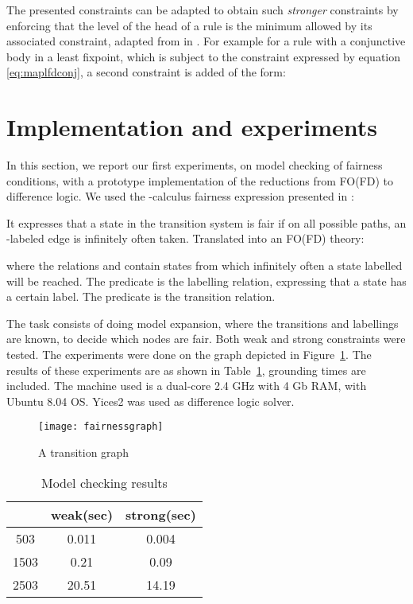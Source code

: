 \documentclass{tlp}
\begin{document}
The presented constraints can be adapted to obtain such \emph{stronger} constraints by enforcing that the level of the head of a rule is the minimum allowed by its associated constraint, adapted from in \cite{lpnmr/JanhunenNS09,amai/Niemela08}. For example for a rule with a conjunctive body in a least fixpoint, which is subject to the constraint expressed by equation \ref{eq:maplfdconj}, a second constraint is added of the form:



\section{Implementation and experiments}\label{sec:exper}
In this section, we report our first experiments, on model checking of fairness conditions, with a prototype implementation of the reductions from FO(FD) to difference logic. We used the -calculus fairness expression presented in \cite{tacas/LiuRS98}:

It expresses that a state in the transition system is fair if on all possible paths, an -labeled edge is infinitely often taken. Translated into an FO(FD) theory:

where the relations  and  contain states from which infinitely often a state labelled  will be reached. The predicate  is the labelling relation, expressing that a state has a certain label. The predicate  is the transition relation.

The task consists of doing model expansion, where the transitions and labellings are known, to decide which nodes are fair. Both weak and strong constraints were tested. The experiments were done on the graph depicted in Figure~\ref{fig:transitiongraph}. The results of these experiments are as shown in Table~\ref{fig:results}, grounding times are included. The machine used is a dual-core 2.4 GHz with 4 Gb RAM, with Ubuntu 8.04 OS. Yices2 was used as difference logic solver.

\begin{figure}
	\centering
	\texttt{[image: fairnessgraph]}
	\caption{A transition graph}
	\label{fig:transitiongraph}
\end{figure}

\begin{table}
\begin{tabular}{|c|c|c|}
\hline
 & weak(sec) & strong(sec) \\
\hline
503 & 0.011	& 0.004 \\
1503 & 0.21 & 0.09 \\
2503 & 20.51 & 14.19 \\
\hline
\end{tabular}
\caption{Model checking results} \label{fig:results}
\end{table}
\end{document}
